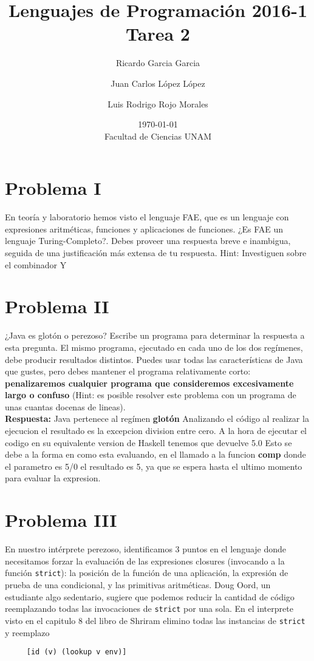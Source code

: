 \documentclass{article}
\title{Lenguajes de Programación 2016-1\\Tarea 2}
\author{Ricardo Garcia Garcia \and  Juan Carlos López López \and Luis Rodrigo Rojo Morales}
\date{\today\\ Facultad de Ciencias UNAM}
\begin{document}
\maketitle
\section*{Problema I}
En teoría y laboratorio hemos visto el lenguaje FAE, que es un lenguaje
con expresiones aritméticas, funciones y aplicaciones de funciones.
¿Es FAE un lenguaje Turing-Completo?. Debes proveer una respuesta breve e inambigua, seguida de una justificación más extensa de tu respuesta.
Hint: Investiguen sobre el combinador Y

\section*{Problema II}
¿Java es glotón o perezoso? Escribe un programa para determinar la respuesta a esta
pregunta. El mismo programa, ejecutado en cada uno de los dos regímenes, debe
producir resultados distintos. Puedes usar todas las características de Java
que gustes, pero debes mantener el programa relativamente corto:
\textbf{penalizaremos cualquier programa que consideremos excesivamente
  largo o confuso } (Hint: es posible resolver este problema con un programa
de unas cuantas docenas de lineas).
\\

\textbf{Respuesta: }
Java pertenece al regímen \textbf{glotón} Analizando el código al realizar la ejecucion el resultado es la excepcion division entre cero.
A la hora de ejecutar el codigo en su equivalente version de Haskell tenemos que devuelve 5.0
Esto se debe a la forma en como esta evaluando, en el llamado a la funcion \textbf{comp} donde el parametro es 5/0 el resultado es 5, ya que se espera hasta el ultimo momento
para evaluar la expresion.


\section*{Problema III}
En nuestro intérprete perezoso, identificamos 3 puntos en el lenguaje donde
necesitamos forzar la evaluación de las expresiones closures (invocando a la
función \texttt{strict}): la posición de la función de una aplicación,
la expresión de prueba de una condicional, y las primitivas aritméticas.
Doug Oord, un estudiante algo sedentario, sugiere que podemos reducir
la cantidad de código reemplazando todas las invocaciones de \texttt{strict}
por una sola. En el interprete visto en el capitulo 8 del libro de Shriram
elimino todas las instancias de \texttt{strict} y reemplazo
\begin{verbatim}
     [id (v) (lookup v env)]
\end{verbatim}
\end{document}

